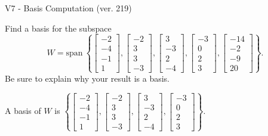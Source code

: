 \begin{exercise}
  \begin{exerciseTitle}V7 - Basis Computation (ver. 219)\end{exerciseTitle}
  \begin{exerciseStatement}
    Find a basis for the subspace 
\[W=\mathrm{span}\ \left\{\left[\begin{array}{r}
-2 \\
-4 \\
-1 \\
1
\end{array}\right] , \left[\begin{array}{r}
-2 \\
3 \\
3 \\
-3
\end{array}\right] , \left[\begin{array}{r}
3 \\
-3 \\
2 \\
-4
\end{array}\right] , \left[\begin{array}{r}
-3 \\
0 \\
2 \\
3
\end{array}\right] , \left[\begin{array}{r}
-14 \\
-2 \\
-9 \\
20
\end{array}\right]\right\}.\]
 Be sure to explain why your result is a basis.


  \end{exerciseStatement}
  \begin{exerciseAnswer}
   A basis of \(W\) is  \(\left\{\left[\begin{array}{r}
-2 \\
-4 \\
-1 \\
1
\end{array}\right] , \left[\begin{array}{r}
-2 \\
3 \\
3 \\
-3
\end{array}\right] , \left[\begin{array}{r}
3 \\
-3 \\
2 \\
-4
\end{array}\right] , \left[\begin{array}{r}
-3 \\
0 \\
2 \\
3
\end{array}\right]\right\}\).
  


  \end{exerciseAnswer}
\end{exercise}